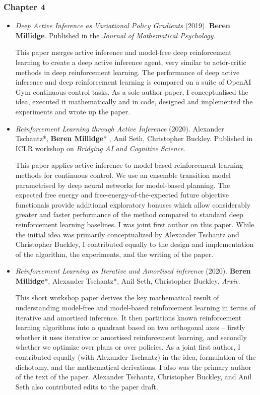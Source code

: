 \subsubsection{Chapter 4}
\begin{itemize}
\item \emph{Deep Active Inference as Variational Policy Gradients} (2019). \textbf{Beren Millidge}. Published in the \emph{Journal of Mathematical Psychology}. 
\newline

This paper merges active inference and model-free deep reinforcement learning to create a deep active inference agent, very similar to actor-critic methods in deep reinforcement learning. The performance of deep active inference and deep reinforcement learning is compared on a suite of OpenAI Gym continuous control tasks. As a sole author paper, I conceptualised the idea, executed it mathematically and in code, designed and implemented the experiments and wrote up the paper. 

\item \emph{Reinforcement Learning through Active Inference} (2020). Alexander Tschantz*, \textbf{Beren Millidge}* , Anil Seth, Christopher Buckley. Published in ICLR workshop on \emph{Bridging AI and Cognitive Science}. \newline

This paper applies active inference to model-based reinforcement learning methods for continuous control. We use an ensemble transition model parametrised by deep neural networks for model-based planning. The expected free energy and free-energy-of-the-expected future objective functionals provide additional exploratory bonuses which allow considerably greater and faster performance of the method compared to standard deep reinforcement learning baselines. I was joint first author on this paper. While the initial idea was primarily conceptualized by Alexander Tschantz and Christopher Buckley, I contributed equally to the design and implementation of the algorithm, the experiments, and the writing of the paper.

\item \emph{Reinforcement Learning as Iterative and Amortised inference} (2020). \textbf{Beren Millidge}*, Alexander Tschantz*, Anil Seth, Christopher Buckley. \emph{Arxiv}. \newline

This short workshop paper derives the key mathematical result of understanding model-free and model-based reinforcement learning in terms of iterative and amortised inference. It then partitions known reinforcement learning algorithms into a quadrant based on two orthogonal axes -- firstly whether it uses iterative or amortised reinforcement learning, and secondly whether we optimize over plans or over policies. As a joint first author, I contributed equally (with Alexander Tschantz) in the idea, formulation of the dichotomy, and the mathematical derivations. I also was the primary author of the text of the paper. Alexander Tschantz, Christopher Buckley, and Anil Seth also contributed edits to the paper draft.


\end{itemize}
